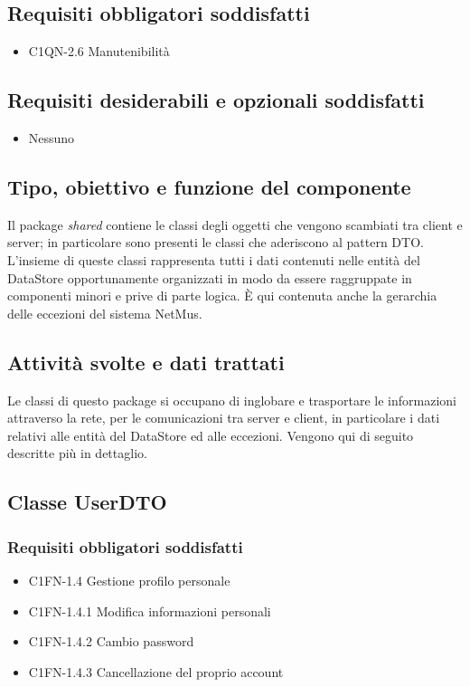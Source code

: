 \subsection*{Requisiti obbligatori soddisfatti}
\begin{itemize}
  	\item C1QN-2.6 Manutenibilit\`a
\end{itemize}
\subsection*{Requisiti desiderabili e opzionali soddisfatti}
\begin{itemize}
    \item Nessuno
\end{itemize}
\subsection*{Tipo, obiettivo e funzione del componente}
Il package \emph{shared} contiene le classi degli oggetti che vengono
scambiati tra client e server; in particolare sono presenti le classi che
aderiscono al pattern DTO. L'insieme di queste classi rappresenta tutti i
dati contenuti nelle entit\`a del DataStore opportunamente organizzati in modo
da essere raggruppate in componenti minori e prive di parte logica.
\`E qui contenuta anche la gerarchia delle eccezioni del sistema NetMus.
\subsection*{Attivit\`a svolte e dati trattati}
Le classi di questo package si occupano di inglobare e trasportare
le informazioni attraverso la rete, per le comunicazioni tra server e client,
in particolare i dati relativi alle entit\`a del DataStore ed alle eccezioni.
Vengono qui di seguito descritte pi\`u in dettaglio.

\subsection{Classe UserDTO}
\subsubsection*{Requisiti obbligatori soddisfatti}
\begin{itemize}
	\item C1FN-1.4 Gestione profilo personale
	\item C1FN-1.4.1 Modifica informazioni personali
	\item C1FN-1.4.2 Cambio password
	\item C1FN-1.4.3 Cancellazione del proprio account
\end{itemize}
